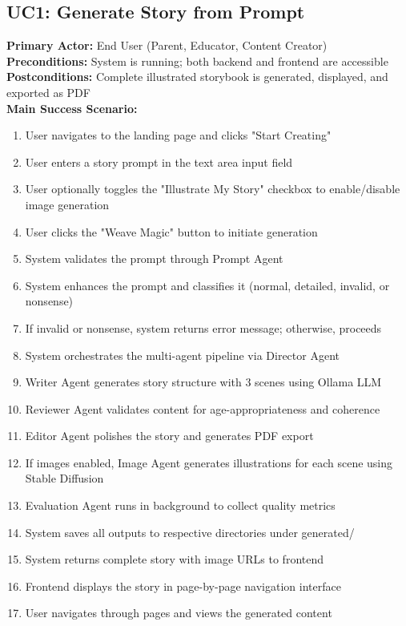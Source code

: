 \subsection{UC1: Generate Story from Prompt}
\textbf{Primary Actor:} End User (Parent, Educator, Content Creator)\\
\textbf{Preconditions:} System is running; both backend and frontend are accessible\\
\textbf{Postconditions:} Complete illustrated storybook is generated, displayed, and exported as PDF\\
\textbf{Main Success Scenario:}
\begin{enumerate}
    \item User navigates to the landing page and clicks "Start Creating"
    \item User enters a story prompt in the text area input field
    \item User optionally toggles the "Illustrate My Story" checkbox to enable/disable image generation
    \item User clicks the "Weave Magic" button to initiate generation
    \item System validates the prompt through Prompt Agent
    \item System enhances the prompt and classifies it (normal, detailed, invalid, or nonsense)
    \item If invalid or nonsense, system returns error message; otherwise, proceeds
    \item System orchestrates the multi-agent pipeline via Director Agent
    \item Writer Agent generates story structure with 3 scenes using Ollama LLM
    \item Reviewer Agent validates content for age-appropriateness and coherence
    \item Editor Agent polishes the story and generates PDF export
    \item If images enabled, Image Agent generates illustrations for each scene using Stable Diffusion
    \item Evaluation Agent runs in background to collect quality metrics
    \item System saves all outputs to respective directories under generated/
    \item System returns complete story with image URLs to frontend
    \item Frontend displays the story in page-by-page navigation interface
    \item User navigates through pages and views the generated content
\end{enumerate}

